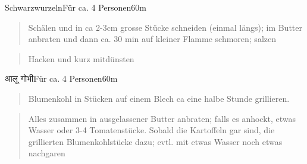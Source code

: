\documentclass[
  a4paper,
]{article}
\begin{document}
\newpage

\begin{recipe}{Schwarzwurzeln}{Für ca. 4 Personen}{60m}


\begin{quote}
Schälen und in ca 2-3cm grosse Stücke schneiden (einmal längs); im
Butter anbraten und dann ca. 30 min auf kleiner Flamme schmoren; salzen
\end{quote}

\freeform\hrulefill


\begin{quote}
Hacken und kurz mitdünsten
\end{quote}

\freeform\hrulefill\newline\freeform{}\end{recipe}

\newpage

\begin{recipe}{आलू गोभी}{Für ca. 4 Personen}{60m}


\begin{quote}
Blumenkohl in Stücken auf einem Blech ca eine halbe Stunde grillieren.
\end{quote}

\freeform\hrulefill


\begin{quote}
Alles zusammen in ausgelassener Butter anbraten; falls es anhockt, etwas
Wasser oder 3-4 Tomatenstücke. Sobald die Kartoffeln gar sind, die
grillierten Blumenkohlstücke dazu; evtl. mit etwas Wasser noch etwas
nachgaren
\end{quote}

\freeform\hrulefill\newline\freeform{}\end{recipe}

\newpage
\end{document}

